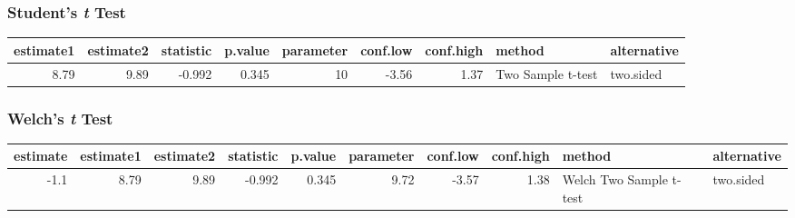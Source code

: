 \documentclass[]{article}
\newenvironment{Shaded}{\begin{snugshade}}{\end{snugshade}}
\newcommand{\KeywordTok}[1]{\textcolor[rgb]{0.13,0.29,0.53}{\textbf{{#1}}}}
\newcommand{\DataTypeTok}[1]{\textcolor[rgb]{0.13,0.29,0.53}{{#1}}}
\newcommand{\StringTok}[1]{\textcolor[rgb]{0.31,0.60,0.02}{{#1}}}
\newcommand{\CommentTok}[1]{\textcolor[rgb]{0.56,0.35,0.01}{\textit{{#1}}}}
\newcommand{\NormalTok}[1]{{#1}}
\begin{document}
\subsubsection{\texorpdfstring{Student's \emph{t}
Test}{Student's t Test}}\label{students-t-test}

\begin{Shaded}
\end{Shaded}

\begin{longtable}[]{@{}rrrrrrrll@{}}
\toprule
estimate1 & estimate2 & statistic & p.value & parameter & conf.low &
conf.high & method & alternative\tabularnewline
\midrule
\endhead
8.79 & 9.89 & -0.992 & 0.345 & 10 & -3.56 & 1.37 & Two Sample t-test &
two.sided\tabularnewline
\bottomrule
\end{longtable}

\subsubsection{\texorpdfstring{Welch's \emph{t}
Test}{Welch's t Test}}\label{welchs-t-test}

\begin{Shaded}
\end{Shaded}

\begin{longtable}[]{@{}rrrrrrrrll@{}}
\toprule
estimate & estimate1 & estimate2 & statistic & p.value & parameter &
conf.low & conf.high & method & alternative\tabularnewline
\midrule
\endhead
-1.1 & 8.79 & 9.89 & -0.992 & 0.345 & 9.72 & -3.57 & 1.38 & Welch Two
Sample t-test & two.sided\tabularnewline
\bottomrule
\end{longtable}
\end{document}
